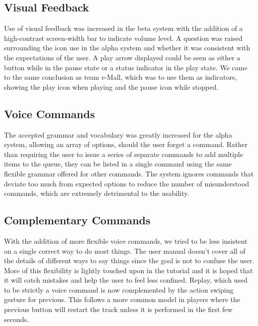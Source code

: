 \documentclass[10pt,letterpaper]{article}
\begin{document}
\subsection*{Visual Feedback}
Use of visual feedback was increased in the beta system with the addition of a high-contrast screen-width bar to indicate volume level. A question was raised surrounding the icon use in the alpha system and whether it was consistent with the expectations of the user. A play arrow displayed could be seen as either a button while in the pause state or a status indicator in the play state. We came to the same conclusion as team e-Mall, which was to use them as indicators, showing the play icon when playing and the pause icon while stopped.

\subsection*{Voice Commands}
The accepted grammar and vocabulary was greatly increased for the alpha system, allowing an array of options, should the user forget a command. Rather than requiring the user to issue a series of separate commands to add multiple items to the queue, they can be listed in a single command using the same flexible grammar offered for other commands. The system ignores commands that deviate too much from expected options to reduce the number of misunderstood commands, which are extremely detrimental to the usability.

\subsection*{Complementary Commands}
With the addition of more flexible voice commands, we tried to be less insistent on a single correct way to do most things. The user manual doesn't cover all of the details of different ways to say things since the goal is not to confuse the user. More of this flexibility is lightly touched upon in the tutorial and it is hoped that it will catch mistakes and help the user to feel less confined. Replay, which used to be strictly a voice command is now complemented by the action swiping gesture for previous. This follows a more common model in players where the previous button will restart the track unless it is performed in the first few seconds.
\end{document}
